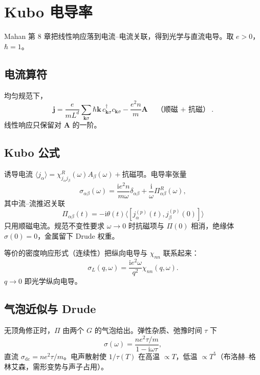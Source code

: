 \section{Kubo 电导率}

Mahan 第 8 章把线性响应落到电流--电流关联，得到光学与直流电导。取 $e>0$，$\hbar=1$。

\subsection{电流算符}

均匀规范下，
\begin{equation}
  \mathbf{j}
  =\frac{e}{m L^d}
  \sum_{\mathbf{k}\sigma}
  \hbar\mathbf{k}\,
  c_{\mathbf{k}\sigma}^\dagger c_{\mathbf{k}\sigma}
  -\frac{e^2 n}{m}\mathbf{A}
  \quad
  \text{（顺磁 $+$ 抗磁）}.
\end{equation}
线性响应只保留对 $\mathbf{A}$ 的一阶。

\subsection{Kubo 公式}

诱导电流 $\langle j_\alpha\rangle=\chi_{j_\alpha j_\beta}^R(\omega)A_\beta(\omega)+\text{抗磁项}$。电导率张量
\begin{equation}
  \sigma_{\alpha\beta}(\omega)
  =\frac{\mathrm{i}e^2 n}{m\omega}\delta_{\alpha\beta}
  +\frac{\mathrm{i}}{\omega}
  \Pi_{\alpha\beta}^R(\omega),
\label{eq:kubo_sigma}
\end{equation}
其中流--流推迟关联
\begin{equation}
  \Pi_{\alpha\beta}(t)
  =-\mathrm{i}\theta(t)
  \bigl\langle
  [j_\alpha^{(p)}(t),j_\beta^{(p)}(0)]
  \bigr\rangle
\end{equation}
只用顺磁电流。规范不变性要求 $\omega\to0$ 时抗磁项与 $\Pi(0)$ 相消，绝缘体 $\sigma(0)=0$，金属留下 Drude 权重。

等价的密度响应形式（连续性）把纵向电导与 $\chi_{nn}$ 联系起来：
\begin{equation}
  \sigma_L(q,\omega)
  =\frac{\mathrm{i}e^2\omega}{q^2}\chi_{nn}(q,\omega).
\end{equation}
$q\to0$ 即光学纵向电导。

\subsection{气泡近似与 Drude}

无顶角修正时，$\Pi$ 由两个 $G$ 的气泡给出。弹性杂质、弛豫时间 $\tau$ 下
\begin{equation}
  \sigma(\omega)
  =\frac{ne^2\tau/m}{1-\mathrm{i}\omega\tau},
\label{eq:drude}
\end{equation}
直流 $\sigma_{\mathrm{dc}}=ne^2\tau/m$。电声散射使 $1/\tau(T)$ 在高温 $\propto T$，低温 $\propto T^5$（布洛赫--格林艾森，需形变势与声子占用）。

